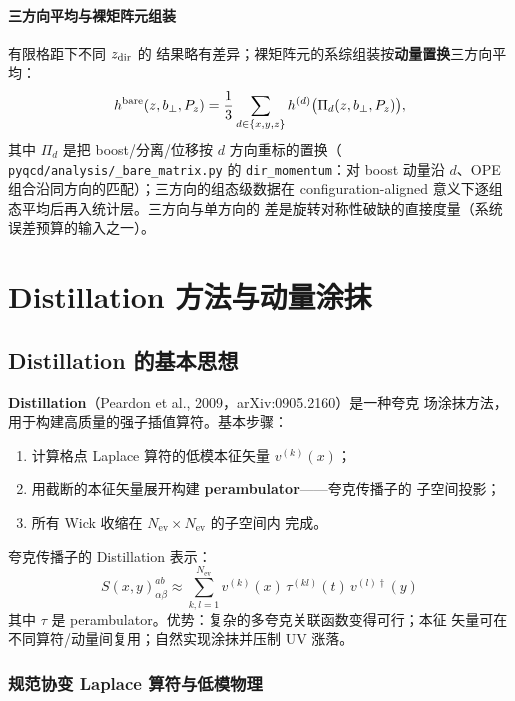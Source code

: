 \documentclass[11pt,a4paper]{ctexart}
\newcommand{\code}[1]{\texttt{#1}}
\newcommand{\bperp}{b_{\perp}}
\begin{document}
\paragraph{三方向平均与裸矩阵元组装}有限格距下不同 $z_{\rm dir}$ 的
结果略有差异；裸矩阵元的系综组装按\textbf{动量置换}三方向平均：
\begin{equation}\label{eq:three-dir-average}
h^{\rm bare}(z,\bperp,P_z) = \frac13\sum_{d\in\{x,y,z\}}
h^{(d)}\bigl(\Pi_d(z,\bperp,P_z)\bigr),
\end{equation}
其中 $\Pi_d$ 是把 boost/分离/位移按 $d$ 方向重标的置换（\code{
pyqcd/analysis/\_bare\_matrix.py} 的 \code{dir\_momentum}：对 boost
动量沿 $d$、OPE 组合沿同方向的匹配）；三方向的组态级数据在
configuration-aligned 意义下逐组态平均后再入统计层。三方向与单方向的
差是旋转对称性破缺的直接度量（系统误差预算的输入之一）。

\section{Distillation 方法与动量涂抹}
\label{sec:distillation}

\subsection{Distillation 的基本思想}

\textbf{Distillation}（Peardon et al., 2009，arXiv:0905.2160）是一种夸克
场涂抹方法，用于构建高质量的强子插值算符。基本步骤：
\begin{enumerate}
  \item 计算格点 Laplace 算符的低模本征矢量 $v^{(k)}(x)$；
  \item 用截断的本征矢量展开构建 \textbf{perambulator}——夸克传播子的
  子空间投影；
  \item 所有 Wick 收缩在 $N_{\text{ev}} \times N_{\text{ev}}$ 的子空间内
  完成。
\end{enumerate}
夸克传播子的 Distillation 表示：
\begin{equation}\label{eq:distillation}
S(x, y)_{\alpha\beta}^{ab} \approx \sum_{k,l=1}^{N_{\text{ev}}}
v^{(k)}(x) \, \tau^{(kl)}(t) \, v^{(l)\dagger}(y)
\end{equation}
其中 $\tau$ 是 perambulator。优势：复杂的多夸克关联函数变得可行；本征
矢量可在不同算符/动量间复用；自然实现涂抹并压制 UV 涨落。

\subsubsection{规范协变 Laplace 算符与低模物理}
\end{document}
